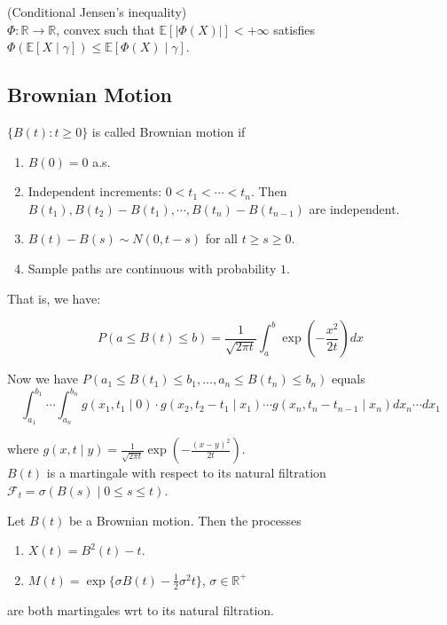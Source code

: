 \documentclass[a4paper]{article}
\newcommand{\nl}{\vspace{0.2cm}\\}
\newcommand{\F}{\mathcal{F}}
\newcommand{\R}{\mathbb{R}}
\newcommand{\E}{\mathbb{E}}
\begin{document}
\begin{lemma}
    (Conditional Jensen's inequality)\nl
    $\Phi : \R \to \R$, convex such that $\E[|\Phi(X)|] < +\infty$ satisfies $\Phi(\E[X \mid \gamma]) \le \E[\Phi(X) \mid \gamma]$.
\end{lemma}

\subsection{Brownian Motion}
$\{B(t) : t \ge 0\}$ is called Brownian motion if
\begin{enumerate}
    \item $B(0) = 0$ a.s.
    \item Independent increments: $0 < t_1 < \cdots < t_n$. Then $B(t_1), B(t_2) - B(t_1), \cdots, B(t_n) - B(t_{n-1})$ are independent.
    \item $B(t) - B(s) \sim N(0, t - s)$ for all $t \ge s \ge 0$.
    \item Sample paths are continuous with probability $1$.
\end{enumerate}

That is, we have:

$$P(a \le B(t) \le b) = \frac{1}{\sqrt{2 \pi t}} \int_a^b \exp(-\frac{x^2}{2t}) dx$$

Now we have $P(a_1 \le B(t_1) \le b_1, ..., a_n \le B(t_n) \le b_n)$ equals
$$
\int_{a_1}^{b_1} \cdots \int_{a_n}^{b_n} g(x_1, t_1 \mid 0) \cdot g(x_2, t_2 - t_1 \mid x_1) \cdots g(x_n, t_n - t_{n-1} \mid x_n) dx_{n} \cdots dx_1$$

where $g(x, t \mid y) = \frac{1}{\sqrt{2 \pi t}} \exp(-\frac{(x-y)^2}{2t})$.\nl

$B(t)$ is a martingale with respect to its natural filtration $\F_t = \sigma(B(s) \mid 0 \le s \le t)$.\nl

\begin{theorem}
    Let $B(t)$ be a Brownian motion. Then the processes
    \begin{enumerate}
        \item $X(t) = B^2(t) - t$.
        \item $M(t) = \exp\{\sigma B(t) - \frac{1}{2} \sigma^2 t\}$, $\sigma \in \R^+$
    \end{enumerate}
    are both martingales wrt to its natural filtration.
\end{theorem}
\end{document}
